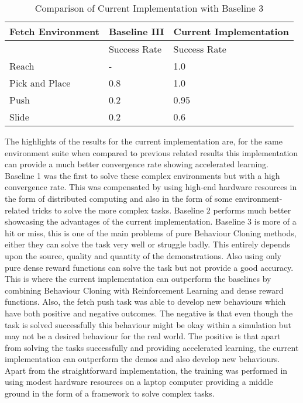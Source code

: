\begin{table}[h!]
\centering
\begin{tabular}{|l|l|l|}
\hline
Fetch Environment & Baseline III   & Current Implementation \\ \hline
                  & Success Rate & Success Rate           \\ \hline
Reach             & -            & 1.0                    \\ \hline
Pick and Place    & 0.8          & 1.0                    \\ \hline
Push              & 0.2          & 0.95                   \\ \hline
Slide             & 0.2          & 0.6                    \\ \hline
\end{tabular}
\caption{Comparison of Current Implementation with Baseline 3}
\label{tab:my-table}
\end{table}

The highlights of the results for the current implementation are, for the same environment suite when compared to previous related results this implementation can provide a much better convergence rate showing accelerated learning. Baseline 1 was the first to solve these complex environments but with a high convergence rate. This was compensated by using high-end hardware resources in the form of distributed computing and also in the form of some environment-related tricks to solve the more complex tasks. Baseline 2 performs much better showcasing the advantages of the current implementation. Baseline 3 is more of a hit or miss, this is one of the main problems of pure Behaviour Cloning methods, either they can solve the task very well or struggle badly. This entirely depends upon the source, quality and quantity of the demonstrations. Also using only pure dense reward functions can solve the task but not provide a good accuracy. This is where the current implementation can outperform the baselines by combining Behaviour Cloning with Reinforcement Learning and dense reward functions. Also, the fetch push task was able to develop new behaviours which have both positive and negative outcomes. The negative is that even though the task is solved successfully this behaviour might be okay within a simulation but may not be a desired behaviour for the real world. The positive is that apart from solving the tasks successfully and providing accelerated learning, the current implementation can outperform the demos and also develop new behaviours. Apart from the straightforward implementation, the training was performed in using modest hardware resources on a laptop computer providing a middle ground in the form of a framework to solve complex tasks. \\

